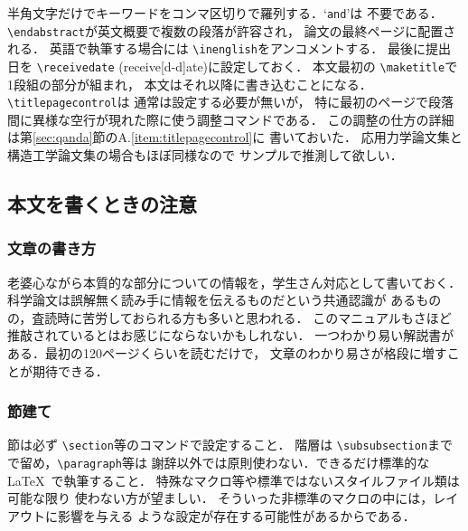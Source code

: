 \documentclass[dvipdfmx,onecolumn]{jsce}  %
\begin{document}
半角文字だけでキーワードをコンマ区切りで羅列する．`{\tt and}'は
不要である．\verb+\endabstract+が英文概要で複数の段落が許容され，
論文の最終ページに配置される．
英語で執筆する場合には \verb+\inenglish+をアンコメントする．
最後に提出日を \verb+\receivedate+ (receive[d-d]ate)に設定しておく．
本文最初の \verb+\maketitle+で1段組の部分が組まれ，
本文はそれ以降に書き込むことになる．\verb+\titlepagecontrol+は
通常は設定する必要が無いが，
特に最初のページで段落間に異様な空行が現れた際に使う調整コマンドである．
この調整の仕方の詳細は第\ref{sec:qanda}節のA.\ref{item:titlepagecontrol}に
書いておいた．
応用力学論文集と構造工学論文集の場合もほぼ同様なので
サンプルで推測して欲しい．

\subsection{本文を書くときの注意}
\label{sec:2-1}

\subsubsection{文章の書き方}
\label{sec:2-1-1}

老婆心ながら本質的な部分についての情報を，学生さん対応として書いておく．
科学論文は誤解無く読み手に情報を伝えるものだという共通認識が
あるものの，査読時に苦労しておられる方も多いと思われる．
このマニュアルもさほど推敲されているとはお感じにならないかもしれない．
一つわかり易い解説書\cite{honda}がある．最初の120ページくらいを読むだけで，
文章のわかり易さが格段に増すことが期待できる．

\subsubsection{節建て}

節は必ず \verb+\section+等のコマンドで設定すること．
階層は \verb+\subsubsection+までで留め，\verb+\paragraph+等は
謝辞以外では原則使わない．できるだけ標準的な\LaTeX\ で執筆すること．
特殊なマクロ等や標準ではないスタイルファイル類は可能な限り
使わない方が望ましい．
そういった非標準のマクロの中には，レイアウトに影響を与える
ような設定が存在する可能性があるからである．
\end{document}
